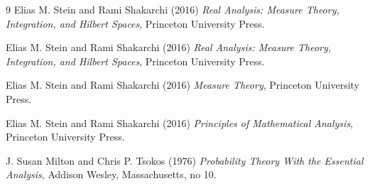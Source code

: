 \documentclass[12pt]{amsart}
\theoremstyle{plain}
\theoremstyle{definition}
\theoremstyle{remark}
\numberwithin{equation}{section}
\numberwithin{thm}{section}
\begin{document}
\begin{thebibliography}{9}
Elias M. Stein and Rami Shakarchi (2016) \emph{Real Analysis: Measure Theory, Integration, and Hilbert Spaces}, Princeton University Press.

Elias M. Stein and Rami Shakarchi (2016) \emph{Real Analysis: Measure Theory, Integration, and Hilbert Spaces}, Princeton University Press.

Elias M. Stein and Rami Shakarchi (2016) \emph{Measure Theory}, Princeton University Press.

Elias M. Stein and Rami Shakarchi (2016) \emph{Principles of Mathematical Analysis}, Princeton University Press.




 
%















J. Susan Milton and Chris P. Tsokos (1976) \emph{Probability Theory With the Essential Analysis}, Addison
Wesley, Massachusetts, no 10.


\end{thebibliography}
\end{document}
